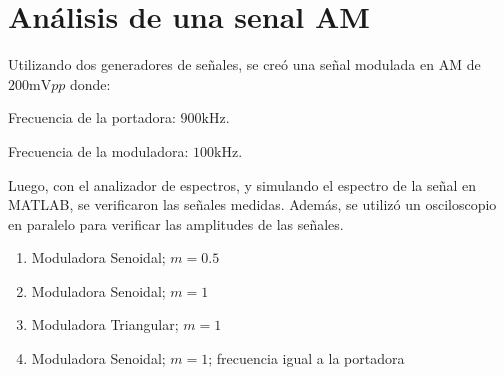 \chapter{Análisis de una senal AM}
Utilizando dos generadores de señales, se creó una señal
modulada en AM de $200 \si{\milli\volt}pp$ donde:

Frecuencia de la portadora: $900 \si{\kilo\hertz}$.

Frecuencia de la moduladora: $100 \si{\kilo\hertz}$.

Luego, con el analizador de espectros, y simulando el espectro
de la señal en MATLAB, se verificaron las señales medidas. Además, se
utilizó un osciloscopio en paralelo para verificar las amplitudes
de las señales.

\begin{enumerate}
    \item Moduladora Senoidal; $m=0.5$
    \item Moduladora Senoidal; $m=1$
    \item Moduladora Triangular; $m=1$
    \item Moduladora Senoidal; $m=1$; frecuencia igual a la portadora
\end{enumerate}